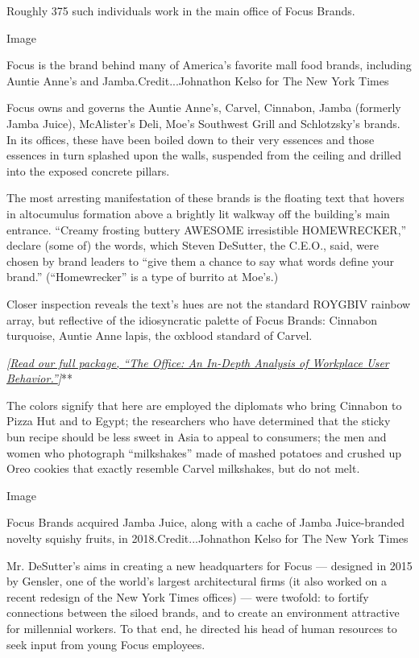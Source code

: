 Roughly 375 such individuals work in the main office of Focus Brands.

Image

Focus is the brand behind many of America's favorite mall food brands,
including Auntie Anne's and Jamba.Credit...Johnathon Kelso for The New
York Times

Focus owns and governs the Auntie Anne's, Carvel, Cinnabon, Jamba
(formerly Jamba Juice), McAlister's Deli, Moe's Southwest Grill and
Schlotzsky's brands. In its offices, these have been boiled down to
their very essences and those essences in turn splashed upon the walls,
suspended from the ceiling and drilled into the exposed concrete
pillars.

The most arresting manifestation of these brands is the floating text
that hovers in altocumulus formation above a brightly lit walkway off
the building's main entrance. ``Creamy frosting buttery AWESOME
irresistible HOMEWRECKER,'' declare (some of) the words, which Steven
DeSutter, the C.E.O., said, were chosen by brand leaders to ``give them
a chance to say what words define your brand.'' (``Homewrecker'' is a
type of burrito at Moe's.)

Closer inspection reveals the text's hues are not the standard ROYGBIV
rainbow array, but reflective of the idiosyncratic palette of Focus
Brands: Cinnabon turquoise, Auntie Anne lapis, the oxblood standard of
Carvel.

\emph{\emph{\emph{{[}}\href{https://www.nytimes3xbfgragh.onion/interactive/2019/09/17/style/the-office.html}{\emph{Read
our full package, ``The Office: An In-Depth Analysis of Workplace User
Behavior.''}}}{]}}**

The colors signify that here are employed the diplomats who bring
Cinnabon to Pizza Hut and to Egypt; the researchers who have determined
that the sticky bun recipe should be less sweet in Asia to appeal to
consumers; the men and women who photograph ``milkshakes'' made of
mashed potatoes and crushed up Oreo cookies that exactly resemble Carvel
milkshakes, but do not melt.

Image

Focus Brands acquired Jamba Juice, along with a cache of Jamba
Juice-branded novelty squishy fruits, in 2018.Credit...Johnathon Kelso
for The New York Times

Mr. DeSutter's aims in creating a new headquarters for Focus ---
designed in 2015 by Gensler, one of the world's largest architectural
firms (it also worked on a recent redesign of the New York Times
offices) --- were twofold: to fortify connections between the siloed
brands, and to create an environment attractive for millennial workers.
To that end, he directed his head of human resources to seek input from
young Focus employees.

